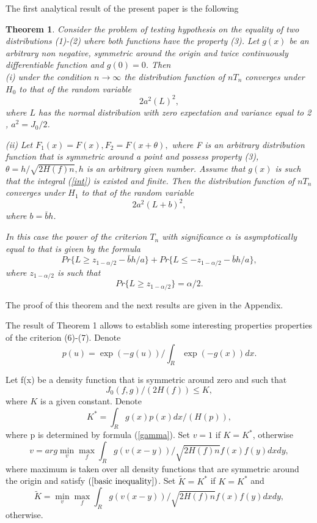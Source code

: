 \documentclass[final,11pt,3p]{elsarticle}
\newtheorem{theorem}{Theorem}
\begin{document}
The first analytical result of the present paper is the following
\begin{theorem} Consider the problem of testing hypothesis on the equality of two distributions (1)-(2) where both functions have the property (3). Let $g(x)$ be an arbitrary non negative, symmetric around the origin and twice continuously differentiable function and $g(0)=0$. Then\\
(i) under the condition $n \to \infty$
the distribution function of $nT_n$  converges under $H_0$ to that of the random variable
\begin{equation}\label{Distr}
2a^2(L)^2,
\end{equation}
where  $L$ has the normal distribution with zero expectation and variance equal to 2  , $a^2=J_0/2$.

(ii)
Let $F_1(x)= F(x),F_2=F(x+\theta),$
where  F is an arbitrary distribution function that is symmetric around a point and possess property   (3),
$\theta=h/\sqrt{2H(f)n},h$ is an arbitrary given number.
Assume that $g(x)$ is such that the integral (\ref{int})
is existed and finite.  Then
the distribution function of $nT_n$  converges under $H_1$ to that of the random variable
$$
2a^2(L + b)^2,
$$
where  $b=\bar b h$.

In this case the power of the criterion $T_n$ with significance $\alpha$ is asymptotically equal to that is given by the formula
$$
Pr\{L\geq z_{1-\alpha/2}-\bar bh/a\}
+ Pr\{L\leq - z_{1-\alpha/2}-\bar bh/a\},
$$
where $z_{1-\alpha/2}$ is such that
$$
Pr \{L\geq z_{1-\alpha/2}\}= \alpha/2.
$$


\end{theorem}





The proof of this theorem and the next results are given in the Appendix.



The result of Theorem 1 allows to establish some interesting properties properties of the criterion (6)-(7).
Denote
\begin{equation}\label{gamma}
p(u) = \exp(-g(u))/\int_R \exp(-g(x)) dx. 
\end{equation}



   

Let f(x) be a density function that is symmetric around zero and  such that 
\begin{equation}\label{basic inequality}
J_0(f,g)/ (2H(f)) \leq K,
\end{equation} 
where $K$ is a given constant. 
Denote
$$
K^*=\int_R g(x)p(x)dx/(H(p)),
$$
where p is determined by formula (\ref{gamma}).
Set $v=1$ if $K=K^*$, otherwise
\begin{equation}\label{coefficient}
v= arg \min_v \max_f \int_R g(v(x-y))/\sqrt{2H(f)n}f(x)f(y)dxdy,
\end{equation}
where maximum is taken over all density functions that are symmetric around the origin and satisfy $(\ref{basic inequality})$.
Set 
$\tilde K = K^*$ if $K=K^*$ and
$$
\tilde K=\min_v \max_f \int_R g(v(x-y))/\sqrt{2H(f)n}f(x)f(y)dxdy,
$$
otherwise.
\end{document}
